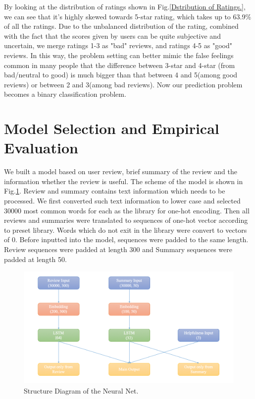 \documentclass[letterpaper]{article} %
\begin{document}
By looking at the distribution of ratings shown in Fig.\ref{Dstribution of Ratings.}, we can see that it's highly skewed towards 5-star rating, which takes up to 63.9\% of all the ratings. Due to the unbalanced distribution of the rating, combined with the fact that the scores given by users can be quite subjective and uncertain, we merge ratings 1-3 as "bad" reviews, and ratings 4-5 as "good" reviews. In this way, the problem setting can better mimic the false feelings common in many people that the difference between 3-star and 4-star (from bad/neutral to good) is much bigger than that between 4 and 5(among good reviews) or between 2 and 3(among bad reviews). Now our prediction problem becomes a binary classification problem.

\section{Model Selection and Empirical Evaluation}
We built a model based on user review, brief summary of the review and the information whether the review is useful. The scheme of the model is shown in Fig.\ref{model}. Review and summary contains text information which needs to be processed. We first converted such text information to lower case and selected 30000 most common words for each as the library for one-hot encoding. Then all reviews and summaries were translated to sequences of one-hot vector according to preset library. Words which do not exit in the library were convert to vectors of 0. Before inputted into the model, sequences were padded to the same length. Review sequences were padded at length 300 and Summary sequences were padded at length 50. 

\begin{figure}[!h]
\centering
\includegraphics[height=6cm,width=1.0\columnwidth]{pics/structure_plot_2.png}
\caption{Structure Diagram of the Neural Net.}
\label{model}
\end{figure}
\end{document}
